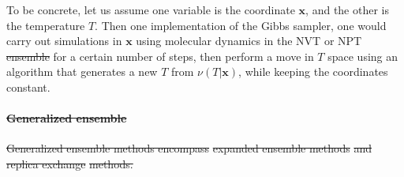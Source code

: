 \documentclass[9pt,review]{livecoms}
\newcommand{\vx}{\mathbf{x}}
\providecommand{\DIFaddtex}[1]{{\protect\color{blue}\uwave{#1}}} %
\providecommand{\DIFdeltex}[1]{{\protect\color{red}\sout{#1}}}                      %
\providecommand{\DIFaddbegin}{} %
\providecommand{\DIFaddend}{} %
\providecommand{\DIFdelbegin}{} %
\providecommand{\DIFdelend}{} %
\providecommand{\DIFadd}[1]{\texorpdfstring{\DIFaddtex{#1}}{#1}} %
\providecommand{\DIFdel}[1]{\texorpdfstring{\DIFdeltex{#1}}{}} %
\newcommand{\DIFscaledelfig}{0.5}
\newlength{\DIFdelgraphicswidth} %
\newlength{\DIFdelgraphicsheight} %
\newcommand{\DIFaddincludegraphics}[2][]{{\color{blue}\fbox{\DIFOincludegraphics[#1]{#2}}}} %
\newcommand{\DIFdelincludegraphics}[2][]{%
\sbox{\DIFdelgraphicsbox}{\DIFOincludegraphics[#1]{#2}}%
\settoboxwidth{\DIFdelgraphicswidth}{\DIFdelgraphicsbox} %
\settoboxtotalheight{\DIFdelgraphicsheight}{\DIFdelgraphicsbox} %
\scalebox{\DIFscaledelfig}{%
\parbox[b]{\DIFdelgraphicswidth}{\usebox{\DIFdelgraphicsbox}\\[-\baselineskip] \rule{\DIFdelgraphicswidth}{0em}}\llap{\resizebox{\DIFdelgraphicswidth}{\DIFdelgraphicsheight}{%
\setlength{\unitlength}{\DIFdelgraphicswidth}%
\begin{picture}(1,1)%
\thicklines\linethickness{2pt} %
{\color[rgb]{1,0,0}\put(0,0){\framebox(1,1){}}}%
{\color[rgb]{1,0,0}\put(0,0){\line( 1,1){1}}}%
{\color[rgb]{1,0,0}\put(0,1){\line(1,-1){1}}}%
\end{picture}%
}\hspace*{3pt}}} %
} %
\DeclareRobustCommand{\DIFaddbegin}{\DIFOaddbegin \let\includegraphics\DIFaddincludegraphics} %
\DeclareRobustCommand{\DIFaddend}{\DIFOaddend \let\includegraphics\DIFOincludegraphics} %
\DeclareRobustCommand{\DIFdelbegin}{\DIFOdelbegin \let\includegraphics\DIFdelincludegraphics} %
\DeclareRobustCommand{\DIFdelend}{\DIFOaddend \let\includegraphics\DIFOincludegraphics} %
\begin{document}
To be concrete, let us assume one variable is the coordinate $\vx$, and the other is the temperature $T$. Then one implementation of the Gibbs sampler, one would carry out simulations in $\vx$ using molecular dynamics in the NVT or NPT \DIFdelbegin \DIFdel{ensemble }\DIFdelend \DIFaddbegin \hyperlink{ref:Ensemble} {\DIFadd{ensemble}} \DIFaddend for a certain number of steps, then perform a move in $T$ space using an algorithm that generates a new $T$ from $\nu(T|\vx)$, while keeping the coordinates constant.

\DIFdelbegin %
\paragraph{\DIFdel{Generalized ensemble}}%
\addtocounter{paragraph}{-1}%
\DIFdel{Generalized ensemble methods encompass }%
\DIFdel{expanded ensemble methods}%
\DIFdel{and }%
\DIFdel{replica exchange}%
\DIFdel{methods. 
}%
\end{document}
